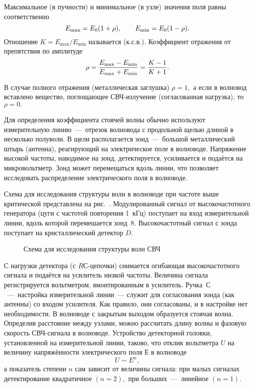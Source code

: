 Максимальное (в пучности) и минимальное (в узле) значения поля равны
соответственно 
\begin{equation} \eqmark{2.0.5} 
E_{\text{max}}=E_0(1+\rho),
\qquad E_{\text{min}}=E_0(1-\rho). 
\end{equation} 
Отношение
$K=E_{\text{max}}/E_{\text{min}}$ называется  (к.с.в.). Коэффициент отражения от препятствия по амплитуде
\begin{equation} \eqmark{2.0.6}
\rho=\dfrac{E_{\text{max}}-E_{\text{min}}}{E_{\text{max}}+E_{\text{min}}}=\dfrac{K-1}{K+1}. 
\end{equation}

В случае полного отражения (металлическая заглушка) $\rho=1,$ а если в волновод
вставлено вещество, поглощающее СВЧ-­излучение (согласованная нагрузка), то
$\rho=0.$

Для определения коэффициента стоячей волны обычно используют измерительную
линию~---~отрезок волновода с продольной щелью длиной в несколько полуволн. В
щели располагается зонд~---~большой металлический штырь (антенна), реагирующий
на электрическое поле в волноводе. Напряжение высокой частоты, наводимое на
зонд, детектируется, усиливается и подаётся на микровольтметр. Зонд может
перемещаться вдоль линии, что позволяет исследовать распределение электрического
поля в волноводе.


\experiment Схема для исследования структуры волн в волноводе при частоте выше
критической представлена на рис.~. Модулированный
сигнал от высокочастотного генератора (цуги с частотой повторения 1~кГц)
поступает на вход измерительной линии, вдоль которой перемешается зонд~8.
Высокочастотный сигнал с зонда поступает на кристаллический детектор $D$.

\begin{figure}[h!]
    \caption{Схема для исследования структуры волн СВЧ} 
\end{figure}

С нагрузки детектора (с $RС$-цепочки) снимается огибающая высокочастотного
сигнала и подаётся на усилитель низкой частоты. Величина сигнала регистрируется
вольтметром, вмонтированным в усилитель. Ручка~$С$~---~настройка измерительной
линии~--- служит для согласования зонда (как антенны) со входом усилителя. Как
правило, они согласованы, и в настройке нет необходимости. В волноводе с
закрытым выходом образуется стоячая волна. Определив расстояние между узлами,
можно рассчитать длину волны и фазовую скорость СВЧ-сигнала в волноводе.
Устройство детекторной головки, установленной на измерительной линии, таково,
что отклик вольтметра $U$ на величину напряжённости электрического поля $Е$ в
волноводе \begin{equation*} U\sim E^{n}, \end{equation*} а показатель степени
$n$ сам зависит от величины сигнала: при малых сигналах детектирование
квадратичное $(n=2),$ при больших~---~линейное $(n=1).$

